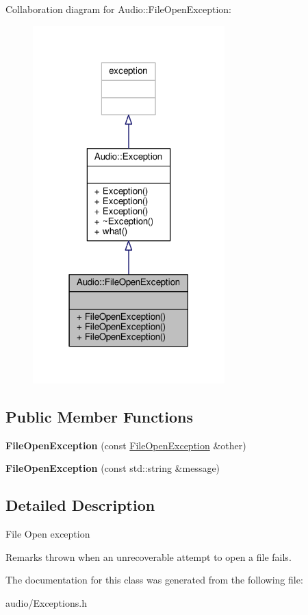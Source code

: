 Collaboration diagram for Audio\+:\+:File\+Open\+Exception\+:
\nopagebreak
\begin{figure}[H]
\begin{center}
\leavevmode
\includegraphics[width=210pt]{d0/d3d/classAudio_1_1FileOpenException__coll__graph}
\end{center}
\end{figure}
\subsection*{Public Member Functions}
\begin{DoxyCompactItemize}
\item 
{\bfseries File\+Open\+Exception} (const \hyperlink{classAudio_1_1FileOpenException}{File\+Open\+Exception} \&other)\hypertarget{classAudio_1_1FileOpenException_a940cda2fb2332655932758a4e15fc7bf}{}\label{classAudio_1_1FileOpenException_a940cda2fb2332655932758a4e15fc7bf}

\item 
{\bfseries File\+Open\+Exception} (const std\+::string \&message)\hypertarget{classAudio_1_1FileOpenException_a4b3a2542a6c34dcacb822e3ecc29585d}{}\label{classAudio_1_1FileOpenException_a4b3a2542a6c34dcacb822e3ecc29585d}

\end{DoxyCompactItemize}


\subsection{Detailed Description}
File Open exception \begin{DoxyRemark}{Remarks}
thrown when an unrecoverable attempt to open a file fails. 
\end{DoxyRemark}


The documentation for this class was generated from the following file\+:\begin{DoxyCompactItemize}
\item 
audio/Exceptions.\+h\end{DoxyCompactItemize}
